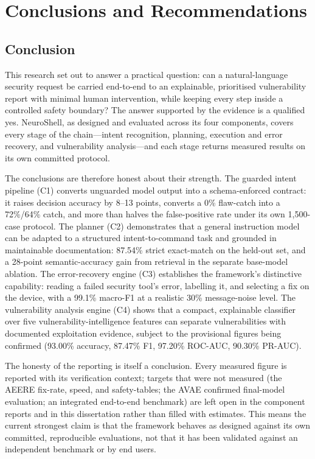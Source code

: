 \chapter{Conclusions and Recommendations}\label{ch:conclusions}

\section{Conclusion}\label{sec:conclusions}

This research set out to answer a practical question: can a natural-language
security request be carried end-to-end to an explainable, prioritised
vulnerability report with minimal human intervention, while keeping every step
inside a controlled safety boundary? The answer supported by the evidence is a
qualified yes. NeuroShell, as designed and evaluated across its four
components, covers every stage of the chain---intent recognition, planning,
execution and error recovery, and vulnerability analysis---and each stage returns
measured results on its own committed protocol.

The conclusions are therefore honest about their strength. The guarded intent
pipeline (C1) converts unguarded model output into a schema-enforced contract:
it raises decision accuracy by 8--13 points, converts a 0\% flaw-catch into a
72\%/64\% catch, and more than halves the false-positive rate under its own
1,500-case protocol. The planner (C2) demonstrates that a general instruction
model can be adapted to a structured intent-to-command task and grounded in
maintainable documentation: 87.54\% strict exact-match on the held-out set, and
a 28-point semantic-accuracy gain from retrieval in the separate base-model
ablation. The error-recovery engine (C3) establishes the framework's
distinctive capability: reading a failed security tool's error, labelling it,
and selecting a fix on the device, with a 99.1\% macro-F1 at a realistic 30\%
message-noise level. The vulnerability analysis engine (C4) shows that a
compact, explainable classifier over five vulnerability-intelligence features
can separate vulnerabilities with documented exploitation evidence, subject to
the provisional figures being confirmed (93.00\% accuracy, 87.47\% F1, 97.20\%
ROC-AUC, 90.30\% PR-AUC).

The honesty of the reporting is itself a conclusion. Every measured figure is
reported with its verification context; targets that were not measured (the
AEERE fix-rate, speed, and safety-tables; the AVAE confirmed final-model
evaluation; an integrated end-to-end benchmark) are left open in the component
reports and in this dissertation rather than filled with estimates. This means
the current strongest claim is that the framework behaves as designed against
its own committed, reproducible evaluations, not that it has been validated
against an independent benchmark or by end users.

